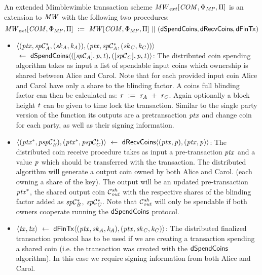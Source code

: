 \begin{definition}
    \label{def:atom:ext-mw-tx-scheme}
    An extended Mimblewimble transaction scheme $\mathit{MW}_{ext}[\mathit{COM},\Phi_{\mathit{MP}},\Pi]$ is an extension to $\mathit{MW}$ with the following two procedures:
    \[ \mathit{MW}_{ext}[\mathit{COM},\Phi_{\mathit{MP}},\Pi] ~:=~ \mathit{MW}[\mathit{COM},\Phi_{\mathit{MP}},\Pi] ~||~ (\mathsf{dSpendCoins}, \mathsf{dRecvCoins}, \mathsf{dFinTx}) \]
    \begin{itemize}
        \item $\langle (\mathit{ptx}, \mathit{sp}\mathcal{C}_{\mathit{A}}^*, (\mathit{sk}_{\mathit{A}},\mathit{\mathit{k}_{\mathit{A}}})), (\mathit{ptx}, \mathit{sp}\mathcal{C}_{\mathit{A}}^*, (\mathit{sk}_{\mathit{C}},\mathit{\mathit{k}_{\mathit{C}}})) \rangle$ \\
        $~\leftarrow~ \mathsf{dSpendCoins} \langle ([\mathit{sp}\mathcal{C}_{\mathit{A}}],\mathit{p},\mathit{t}), ([\mathit{sp}\mathcal{C}_{\mathit{C}}],\mathit{p},\mathit{t}) \rangle$:
        The distributed coin spending algorithm takes as input a list of spendable input coins which ownership is shared between Alice and Carol.
        Note that for each provided input coin Alice and Carol have only a share to the blinding factor.
        A coins full blinding factor can then be calculated as:
        $\mathit{r} ~:=~ \mathit{r}_{\mathit{A}} ~+~ \mathit{r}_{\mathit{C}}$.
        Again optionally a block height $\mathit{t}$ can be given to time lock the transaction.
        Similar to the single party version of the function its outputs are a pretransaction $\mathit{ptx}$ and change coin for each party, as well as their signing information.
        \item $\langle (\mathit{ptx}^*, \mathit{psp}\mathcal{C}_{\mathit{B}}^*), (\mathit{ptx}^*, \mathit{psp}\mathcal{C}_{\mathit{C}}^*) \rangle ~\leftarrow~ \mathsf{dRecvCoins} \langle(\mathit{ptx},\mathit{p}), (\mathit{ptx},\mathit{p}) \rangle$: The distributed coin receive procedure takes as input a pre-transaction $\mathit{ptx}$ and a value $\mathit{p}$ which should be transferred with the transaction.
        The distributed algorithm will generate a output coin owned by both Alice and Carol. (each owning a share of the key).
        The output will be an updated pre-transaction $\mathit{ptx}^*$, the shared output coin $\mathcal{C}_{\mathit{out}}^{\mathit{sh}}$ with the respective shares of the blinding factor added as $\mathit{sp}\mathcal{C}_{\mathit{B}}^*$, $\mathit{sp}\mathcal{C}_{\mathit{C}}^*$.
        Note that $\mathcal{C}_{\mathit{out}}^{\mathit{sh}}$ will only be spendable if both owners cooperate running the $\mathsf{dSpendCoins}$ protocol.
        \item $\langle \mathit{tx}, \mathit{tx} \rangle ~\leftarrow~ \mathsf{dFinTx} \langle(\mathit{ptx},\mathit{sk}_{\mathit{A}},\mathit{\mathit{k}_{\mathit{A}}}),(\mathit{ptx},\mathit{sk}_{\mathit{C}},\mathit{\mathit{k}_{\mathit{C}}})\rangle$: The distributed finalized transaction protocol has to be used if we are creating a transaction spending a shared coin (i.e. the transaction was created with the $\mathsf{dSpendCoins}$ algorithm).
        In this case we require signing information from both Alice and Carol.
    \end{itemize}
\end{definition}

